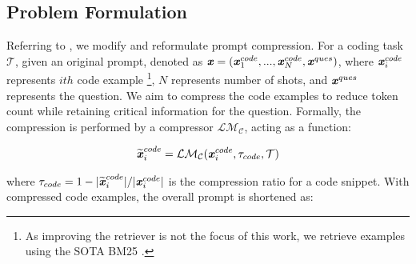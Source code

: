 \subsection{Problem Formulation}
Referring to \citealp{llmlingua}, we modify and reformulate prompt compression. For a coding task $\mathcal{T}$, given an original prompt, denoted as $\textbf{\textit{x}} = (\textbf{\textit{x}}_1^{code}, ..., \textbf{\textit{x}}_N^{code}, \textbf{\textit{x}}^{ques})$, where $\textbf{\textit{x}}_i^{code}$ represents $ith$ code example \footnote{As improving the retriever is not the focus of this work, we retrieve examples using the SOTA BM25 \citep{he2024}.}, $N$ represents number of shots, and $\textbf{\textit{x}}^{ques}$ represents the question. We aim to compress the code examples to reduce token count while retaining critical information for the question. Formally, the compression is performed by a compressor $\mathcal{LM_C}$, acting as a function:

\setlength{\abovedisplayskip}{7pt} %
\setlength{\belowdisplayskip}{5pt} %
\begin{align}
\widetilde{\textbf{\textit{x}}}_i^{code}=\mathcal{LM_C}(\textbf{\textit{x}}_i^{code},\tau_{code}, \mathcal{T})
\end{align}\label{eq:lmc}

\noindent where $\tau_{code}=1-|\widetilde{\textbf{\textit{x}}}_i^{code}|/|\textbf{\textit{x}}_i^{code}|$ is the compression ratio for a code snippet. With compressed code examples, the overall prompt is shortened as:

